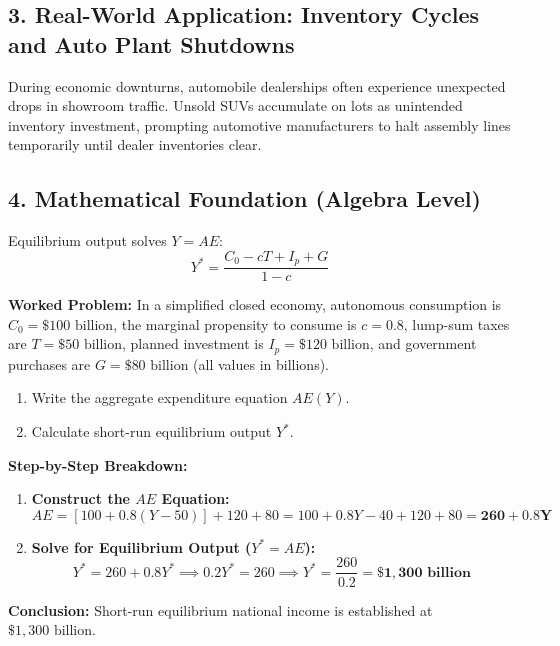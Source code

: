 \documentclass[11pt,letterpaper]{article}
\begin{document}
\subsection*{3. Real-World Application: Inventory Cycles and Auto Plant Shutdowns}
During economic downturns, automobile dealerships often experience unexpected drops in showroom traffic. Unsold SUVs accumulate on lots as unintended inventory investment, prompting automotive manufacturers to halt assembly lines temporarily until dealer inventories clear.

\subsection*{4. Mathematical Foundation (Algebra Level)}
Equilibrium output solves $Y = AE$:
\begin{equation}
Y^* = \frac{C_0 - cT + I_p + G}{1 - c}
\end{equation}

\noindent\textbf{Worked Problem:}
In a simplified closed economy, autonomous consumption is $C_0 = \$100\text{ billion}$, the marginal propensity to consume is $c = 0.8$, lump-sum taxes are $T = \$50\text{ billion}$, planned investment is $I_p = \$120\text{ billion}$, and government purchases are $G = \$80\text{ billion}$ (all values in billions).
\begin{enumerate}
    \item Write the aggregate expenditure equation $AE(Y)$.
    \item Calculate short-run equilibrium output $Y^*$.
\end{enumerate}

\noindent\textbf{Step-by-Step Breakdown:}
\begin{enumerate}
    \item \textbf{Construct the $AE$ Equation:}
    \[
    AE = [100 + 0.8(Y - 50)] + 120 + 80 = 100 + 0.8Y - 40 + 120 + 80 = \mathbf{260 + 0.8Y}
    \]

    \item \textbf{Solve for Equilibrium Output ($Y^* = AE$):}
    \[
    Y^* = 260 + 0.8Y^* \implies 0.2Y^* = 260 \implies Y^* = \frac{260}{0.2} = \mathbf{\$1{,}300\text{ billion}}
    \]
\end{enumerate}
\textbf{Conclusion:} Short-run equilibrium national income is established at $\$1{,}300\text{ billion}$.

\end{document}
